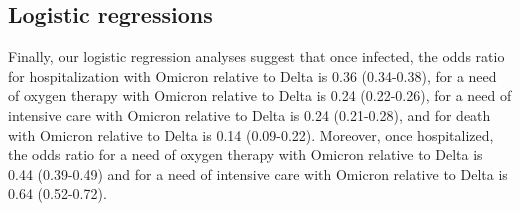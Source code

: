 \documentclass[preprint,12pt,authoryear]{elsarticle}
\begin{document}
\subsection*{Logistic regressions}

Finally, our logistic regression analyses suggest that once infected, the odds ratio for hospitalization with Omicron relative to Delta is 0.36 (0.34-0.38), for a need of oxygen therapy with Omicron relative to Delta is 0.24 (0.22-0.26), for a need of intensive care with Omicron relative to Delta is 0.24 (0.21-0.28), and for death with Omicron relative to Delta is 0.14 (0.09-0.22). Moreover, once hospitalized, the odds ratio for a need of oxygen therapy with Omicron relative to Delta is 0.44 (0.39-0.49) and for a need of intensive care with Omicron relative to Delta is 0.64 (0.52-0.72).

 
 
\end{document}
